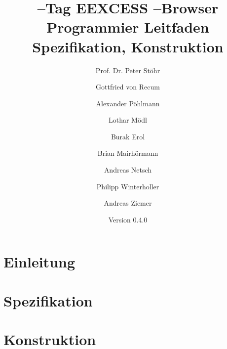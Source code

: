 \documentclass[
    DIV12,
    headings=normal,
    pdftex,
    final
]{scrreprt}
\title{
  \SEARCH--Tag EEXCESS \SECH--Browser \\[1em]
  Programmier Leitfaden\\
Spezifikation, Konstruktion
}
\author{Prof. Dr. Peter Stöhr \and Gottfried von Recum \and Alexander Pöhlmann \and Lothar Mödl \and Burak Erol \and Brian Mairhörmann \and Andreas Netsch \and Philipp Winterholler \and Andreas Ziemer}
\date{Version 0.4.0}
\begin{document}
\maketitle
{}
\tableofcontents

{}

\part{Einleitung}




\part{Spezifikation}




\part{Konstruktion}




\listoffigures
\listoftables
\end{document}
